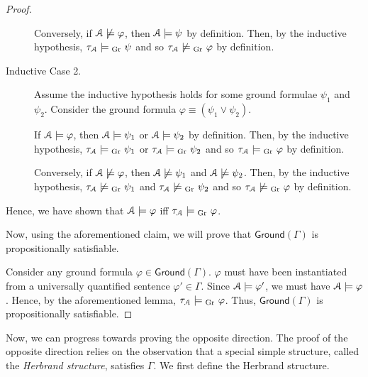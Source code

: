 \documentclass[11pt,usenames, dvipsnames]{article}
\begin{document}
\begin{proof}
\begin{subproof}[Subproof.]
\begin{description}
      Conversely, if $\struct \not\models \varphi$, then $\struct \models \psi$ by definition. Then, by the inductive hypothesis, $\tau_\struct \grmodels \psi$ and so $\tau_\struct \not\grmodels \varphi$ by definition.

      \item[Inductive Case 2.] Assume the inductive hypothesis holds for some ground formulae $\psi_1$ and $\psi_2$. Consider the ground formula $\varphi \equiv (\psi_1 \lor \psi_2)$.
      
      If $\struct \models \varphi$, then $\struct \models \psi_1$ or $\struct \models \psi_2$ by definition. Then, by the inductive hypothesis, $\tau_\struct \grmodels \psi_1$ or $\tau_\struct \grmodels \psi_2$ and so $\tau_\struct \grmodels \varphi$ by definition.

      Conversely, if $\struct \not\models \varphi$, then $\struct \not\models \psi_1$ and $\struct \not\models \psi_2$. Then, by the inductive hypothesis, $\tau_\struct \not\grmodels \psi_1$ and $\tau_\struct \not\grmodels \psi_2$ and so $\tau_\struct \not\grmodels \varphi$ by definition.
    \end{description}

    Hence, we have shown that $\struct \models \varphi$ iff $\tau_\struct \grmodels \varphi$.
  \end{subproof}

  Now, using the aforementioned claim, we will prove that $\mathsf{Ground}(\Gamma)$ is propositionally satisfiable.
  
  Consider any ground formula $\varphi \in \mathsf{Ground}(\Gamma)$. $\varphi$ must have been instantiated from a universally quantified sentence $\varphi' \in \Gamma$. Since $\struct \models \varphi'$, we must have $\struct \models \varphi$. Hence, by the aforementioned lemma, $\tau_\struct \grmodels \varphi$. Thus, $\mathsf{Ground}(\Gamma)$ is propositionally satisfiable.
\end{proof}

Now, we can progress towards proving the opposite direction. The proof of the opposite direction relies on the observation that a special simple structure, called the \emph{Herbrand structure}, satisfies $\Gamma$. We first define the Herbrand structure.
\end{document}
